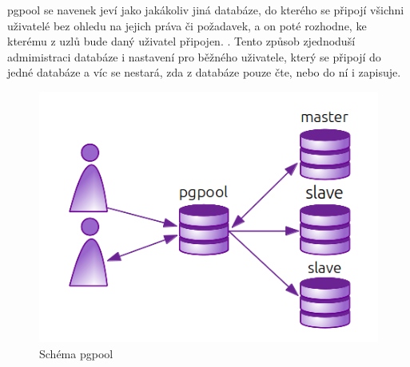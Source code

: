 pgpool se navenek jeví jako jakákoliv jiná databáze, do kterého se připojí všichni uživatelé bez ohledu na jejich práva či požadavek, a on poté rozhodne, ke kterému z uzlů bude daný uživatel připojen. \citep{Boszormenyi2013}. Tento způsob zjednoduší admimistraci databáze i nastavení pro běžného uživatele, který se připojí do jedné databáze a víc se nestará, zda z databáze pouze čte, nebo do ní i zapisuje. 

          \begin{figure}[H]
            \centering
            \includegraphics[scale=1]{../../../grafy/obr/schema_pgpool.png}
            \caption{Schéma pgpool}
            \label{pgpool_obr}
          \end{figure}

